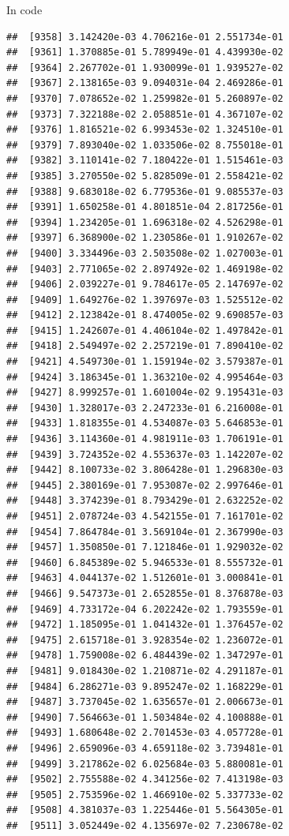 \documentclass[ignorenonframetext,]{beamer}
\begin{document}
\begin{frame}[fragile]{In code}
\begin{verbatim}
##  [9358] 3.142420e-03 4.706216e-01 2.551734e-01
##  [9361] 1.370885e-01 5.789949e-01 4.439930e-02
##  [9364] 2.267702e-01 1.930099e-01 1.939527e-02
##  [9367] 2.138165e-03 9.094031e-04 2.469286e-01
##  [9370] 7.078652e-02 1.259982e-01 5.260897e-02
##  [9373] 7.322188e-02 2.058851e-01 4.367107e-02
##  [9376] 1.816521e-02 6.993453e-02 1.324510e-01
##  [9379] 7.893040e-02 1.033506e-02 8.755018e-01
##  [9382] 3.110141e-02 7.180422e-01 1.515461e-03
##  [9385] 3.270550e-02 5.828509e-01 2.558421e-02
##  [9388] 9.683018e-02 6.779536e-01 9.085537e-03
##  [9391] 1.650258e-01 4.801851e-04 2.817256e-01
##  [9394] 1.234205e-01 1.696318e-02 4.526298e-01
##  [9397] 6.368900e-02 1.230586e-01 1.910267e-02
##  [9400] 3.334496e-03 2.503508e-02 1.027003e-01
##  [9403] 2.771065e-02 2.897492e-02 1.469198e-02
##  [9406] 2.039227e-01 9.784617e-05 2.147697e-02
##  [9409] 1.649276e-02 1.397697e-03 1.525512e-02
##  [9412] 2.123842e-01 8.474005e-02 9.690857e-03
##  [9415] 1.242607e-01 4.406104e-02 1.497842e-01
##  [9418] 2.549497e-02 2.257219e-01 7.890410e-02
##  [9421] 4.549730e-01 1.159194e-02 3.579387e-01
##  [9424] 3.186345e-01 1.363210e-02 4.995464e-03
##  [9427] 8.999257e-01 1.601004e-02 9.195431e-03
##  [9430] 1.328017e-03 2.247233e-01 6.216008e-01
##  [9433] 1.818355e-01 4.534087e-03 5.646853e-01
##  [9436] 3.114360e-01 4.981911e-03 1.706191e-01
##  [9439] 3.724352e-02 4.553637e-03 1.142207e-02
##  [9442] 8.100733e-02 3.806428e-01 1.296830e-03
##  [9445] 2.380169e-01 7.953087e-02 2.997646e-01
##  [9448] 3.374239e-01 8.793429e-01 2.632252e-02
##  [9451] 2.078724e-03 4.542155e-01 7.161701e-02
##  [9454] 7.864784e-01 3.569104e-01 2.367990e-03
##  [9457] 1.350850e-01 7.121846e-01 1.929032e-02
##  [9460] 6.845389e-02 5.946533e-01 8.555732e-01
##  [9463] 4.044137e-02 1.512601e-01 3.000841e-01
##  [9466] 9.547373e-01 2.652855e-01 8.376878e-03
##  [9469] 4.733172e-04 6.202242e-02 1.793559e-01
##  [9472] 1.185095e-01 1.041432e-01 1.376457e-02
##  [9475] 2.615718e-01 3.928354e-02 1.236072e-01
##  [9478] 1.759008e-02 6.484439e-02 1.347297e-01
##  [9481] 9.018430e-02 1.210871e-02 4.291187e-01
##  [9484] 6.286271e-03 9.895247e-02 1.168229e-01
##  [9487] 3.737045e-02 1.635657e-01 2.006673e-01
##  [9490] 7.564663e-01 1.503484e-02 4.100888e-01
##  [9493] 1.680648e-02 2.701453e-03 4.057728e-01
##  [9496] 2.659096e-03 4.659118e-02 3.739481e-01
##  [9499] 3.217862e-02 6.025684e-03 5.880081e-01
##  [9502] 2.755588e-02 4.341256e-02 7.413198e-03
##  [9505] 2.753596e-02 1.466910e-02 5.337733e-02
##  [9508] 4.381037e-03 1.225446e-01 5.564305e-01
##  [9511] 3.052449e-02 4.135697e-02 7.230678e-02

\end{verbatim}
\end{frame}
\end{document}
